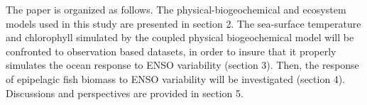 
The paper is organized as follows. The physical-biogeochemical and ecosystem models used in this study are presented in section 2. The sea-surface temperature and chlorophyll simulated by the coupled physical biogeochemical model will be confronted to observation based datasets, in order to insure that it properly simulates the ocean response to ENSO variability (section 3). Then, the response of epipelagic fish biomass to ENSO variability will be investigated (section 4). Discussions and perspectives are provided in section 5.

